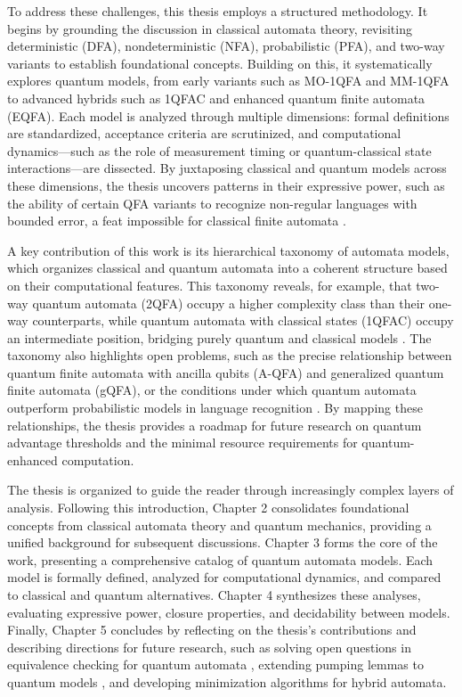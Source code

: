 To address these challenges, this thesis employs a structured methodology. It begins by grounding the discussion in classical automata theory, revisiting deterministic (DFA), nondeterministic (NFA), probabilistic (PFA), and two-way variants to establish foundational concepts. Building on this, it systematically explores quantum models, from early variants such as MO-1QFA \cite{moore2000quantum} and MM-1QFA \cite{kondacs1997power} to advanced hybrids such as 1QFAC \cite{zheng2012one} and enhanced quantum finite automata (EQFA). Each model is analyzed through multiple dimensions: formal definitions are standardized, acceptance criteria are scrutinized, and computational dynamics—such as the role of measurement timing or quantum-classical state interactions—are dissected. By juxtaposing classical and quantum models across these dimensions, the thesis uncovers patterns in their expressive power, such as the ability of certain QFA variants to recognize non-regular languages with bounded error, a feat impossible for classical finite automata \cite{ambainis2009superiority}.  

A key contribution of this work is its hierarchical taxonomy of automata models, which organizes classical and quantum automata into a coherent structure based on their computational features. This taxonomy reveals, for example, that two-way quantum automata (2QFA) occupy a higher complexity class than their one-way counterparts, while quantum automata with classical states (1QFAC) occupy an intermediate position, bridging purely quantum and classical models \cite{yakaryilmaz2010succinctness}. The taxonomy also highlights open problems, such as the precise relationship between quantum finite automata with ancilla qubits (A-QFA) and generalized quantum finite automata (gQFA), or the conditions under which quantum automata outperform probabilistic models in language recognition \cite{hirvensalo2012quantum}. By mapping these relationships, the thesis provides a roadmap for future research on quantum advantage thresholds and the minimal resource requirements for quantum-enhanced computation.  

The thesis is organized to guide the reader through increasingly complex layers of analysis. Following this introduction, Chapter 2 consolidates foundational concepts from classical automata theory and quantum mechanics, providing a unified background for subsequent discussions. Chapter 3 forms the core of the work, presenting a comprehensive catalog of quantum automata models. Each model is formally defined, analyzed for computational dynamics, and compared to classical and quantum alternatives. Chapter 4 synthesizes these analyses, evaluating expressive power, closure properties, and decidability between models. Finally, Chapter 5 concludes by reflecting on the thesis’s contributions and describing directions for future research, such as solving open questions in equivalence checking for quantum automata \cite{li2012characterizations}, extending pumping lemmas to quantum models \cite{ambainis1998one}, and developing minimization algorithms for hybrid automata.  

